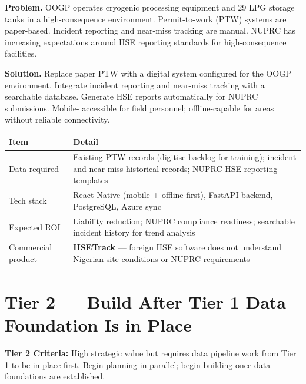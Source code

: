\documentclass[10pt]{article}
\newcommand{\spacer}{\vspace{10pt}}
\newcommand{\bigspacer}{\vspace{16pt}}
\begin{document}
\textbf{Problem.}
OOGP operates cryogenic processing equipment and 29 LPG storage tanks in a
high-consequence environment. Permit-to-work (PTW) systems are paper-based.
Incident reporting and near-miss tracking are manual. NUPRC has increasing
expectations around HSE reporting standards for high-consequence facilities.

\textbf{Solution.}
Replace paper PTW with a digital system configured for the OOGP environment.
Integrate incident reporting and near-miss tracking with a searchable
database. Generate HSE reports automatically for NUPRC submissions. Mobile-
accessible for field personnel; offline-capable for areas without reliable
connectivity.

\spacer
\small
\begin{tabularx}{\columnwidth}{@{}lX@{}}
\toprule
\textbf{Item} & \textbf{Detail} \\
\midrule
Data required     & Existing PTW records (digitise backlog for training);
                    incident and near-miss historical records; NUPRC HSE
                    reporting templates \\
Tech stack        & React Native (mobile + offline-first), FastAPI backend,
                    PostgreSQL, Azure sync \\
Expected ROI      & Liability reduction; NUPRC compliance readiness; searchable
                    incident history for trend analysis \\
Commercial product & \textbf{HSETrack} --- foreign HSE software does not
                    understand Nigerian site conditions or NUPRC requirements \\
\bottomrule
\end{tabularx}
\normalsize

\bigspacer

\section{Tier 2 --- Build After Tier 1 Data Foundation Is in Place}

\noindent\colorbox{tier2!8}{%
\begin{minipage}{\dimexpr\textwidth-2\fboxsep}
  \vspace{4pt}
  {\small\color{tier2}\textbf{Tier 2 Criteria:}
  High strategic value but requires data pipeline work from Tier 1 to be in
  place first. Begin planning in parallel; begin building once data foundations
  are established.}
  \vspace{4pt}
\end{minipage}}
\end{document}
